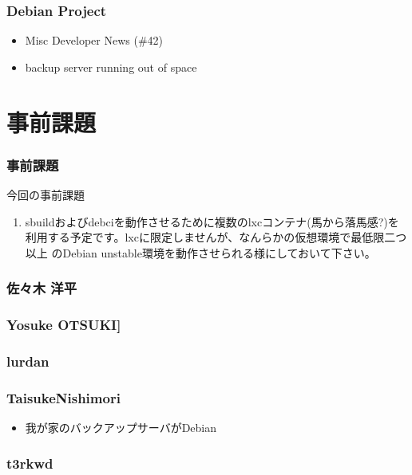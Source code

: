 \documentclass[cjk,dvipdfmx,10pt,compress,%
hyperref={bookmarks=true,bookmarksnumbered=true,bookmarksopen=false,%
colorlinks=false,%
pdftitle={第 115 回 関西 Debian 勉強会},%
pdfauthor={倉敷・のがた・佐々木・かわだ・オオツキ},%
pdfsubject={資料},%
}]{beamer}
\begin{document}
\begin{frame}[fragile]
  \frametitle{Debian Project}
  \begin{itemize}
  \item Misc Developer News (\#42)
  \item backup server running out of space
  \end{itemize}
\end{frame}


\section{事前課題}

\begin{frame}[fragile]
  \frametitle{事前課題}
  \begin{block}{今回の事前課題}
    \begin{enumerate}
    \item sbuildおよびdebciを動作させるために複数のlxcコンテナ(馬から落馬感?)を
      利用する予定です。lxcに限定しませんが、なんらかの仮想環境で最低限二つ以上
      のDebian unstable環境を動作させられる様にしておいて下さい。
    \end{enumerate}
  \end{block}
\end{frame}


\begin{frame}
  \frametitle{ 佐々木 洋平 }
\end{frame}

\begin{frame}
  \frametitle{ Yosuke OTSUKI] }
\end{frame}

\begin{frame}
  \frametitle{ lurdan }
\end{frame}

\begin{frame}
  \frametitle{ TaisukeNishimori }
  \begin{itemize}
  \item 我が家のバックアップサーバがDebian
  \end{itemize}
\end{frame}

\begin{frame}
  \frametitle{ t3rkwd }
\end{frame}
\end{document}
